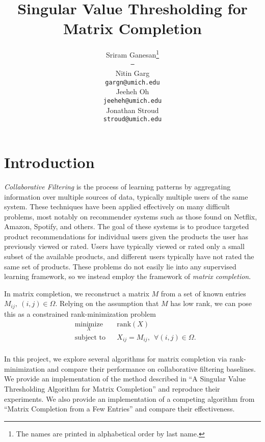 \documentclass{article} %
\title{Singular Value Thresholding for Matrix Completion}
\author{
Sriram Ganesan\thanks{ The names are printed in alphabetical order by last name.} \\
\texttt{---} \\
\And
Nitin Garg \\
\texttt{gargn@umich.edu} \\
\AND
Jeeheh Oh \\
\texttt{jeeheh@umich.edu} \\
\And
Jonathan Stroud \\
\texttt{stroud@umich.edu} \\
}
\begin{document}
\maketitle

\begin{abstract}

\end{abstract}

\section{Introduction}

\emph{Collaborative Filtering} is the process of learning patterns by
aggregating information over multiple sources of data, typically
multiple users of the same system. These techniques have been applied
effectively on many difficult problems, most notably on recommender
systems such as those found on Netflix, Amazon, Spotify, and others.
The goal of these systems is to produce targeted product
recommendations for individual users given the products the user has
previously viewed or rated. Users have typically viewed or rated only
a small subset of the available products, and different users
typically have not rated the same set of products. These problems do
not easily lie into any supervised learning framework, so we instead
employ the framework of \emph{matrix completion}.

In matrix completion, we reconstruct a matrix $M$ from a set of known
entries $M_{ij}, \ (i,j) \in \Omega$. Relying on the assumption that
$M$ has low rank, we can pose this as a constrained rank-minimization
problem
\begin{equation*}
\begin{aligned}
  & \underset{X}{\text{minimize}} & & \mathrm{rank}(X) \\
  & \text{subject to}             & & X_{ij} = M_{ij}, \ \ \forall (i, j)
  \in \Omega. \\
\end{aligned}
\end{equation*}

In this project, we explore several algorithms for matrix completion
via rank-minimization and compare their performance on collaborative
filtering baselines. We provide an implementation of the method
described in ``A Singular Value Thresholding Algorithm for Matrix
Completion'' \cite{cai2010singular} and reproduce their experiments.
We also provide an implementation of a competing algorithm from
``Matrix Completion from a Few Entries'' \cite{keshavan2010matrix} and
compare their effectiveness.
\end{document}
